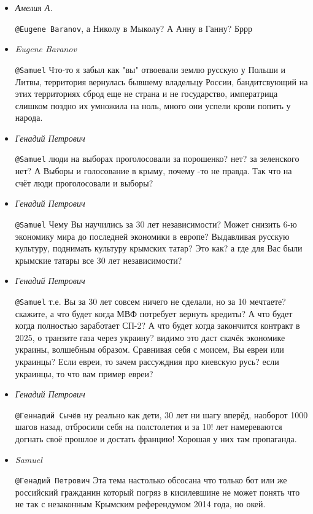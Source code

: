 \begin{itemize}
\begin{itemize}
\item \emph{Амелия А.}

\verb|@Eugene Baranov|, а Николу в Мыколу? А Анну в Ганну? Бррр

\item \emph{Eugene Baranov}

\verb|@Samuel|  Что-то я забыл как "вы" отвоевали землю русскую у Польши и Литвы,
территория вернулась бывшему владельцу России, бандитсвующий на этих
территориях сброд еще не страна и не государство, императрица слишком поздно
их умножила на ноль, много они успели крови попить у народа.

\item \emph{Генадий Петрович}

\verb|@Samuel|  люди на выборах проголосовали за порошенко? нет? за зеленского нет? А
Выборы и голосование в крыму, почему -то не правда. Так что на счёт люди
проголосовали и выборы?

\item \emph{Генадий Петрович}

\verb|@Samuel|  Чему Вы научились за 30 лет независимости? Может снизить 6-ю
экономику мира до последней экономики в европе?  Выдавливая русскую культуру,
поднимать культуру крымских татар? Это как? а где для Вас были крымские татары
все 30 лет независимости?

\item \emph{Генадий Петрович}

\verb|@Samuel|  т.е. Вы за 30 лет совсем ничего не сделали, но за 10 мечтаете?
скажите, а что будет когда МВФ потребует вернуть кредиты? А что будет когда
полностью заработает СП-2? А что будет когда закончится контракт в 2025, о
транзите газа через украину? видимо это даст скачёк экономике украины,
волшебным образом. Сравнивая себя с моисем, Вы евреи или украинцы? Если евреи,
то зачем рассуждния про киевскую русь? если украинцы, то что вам пример евреи?

\item \emph{Генадий Петрович}

\verb|@Геннадий Сычёв|  ну реально как дети, 30 лет ни шагу вперёд, наоборот 1000
шагов назад, отбросили себя на полстолетия и за 10! лет намереваются догнать
своё прошлое и достать францию! Хорошая у них там пропаганда.

\item \emph{Samuel}

\verb|@Генадий Петрович|  Эта тема настолько обсосана что только бот или же
российский гражданин который погряз в кисилевшине не может понять что не так с
незаконным Крымским референдумом 2014 года, но окей. 


\end{itemize}
\end{itemize}
